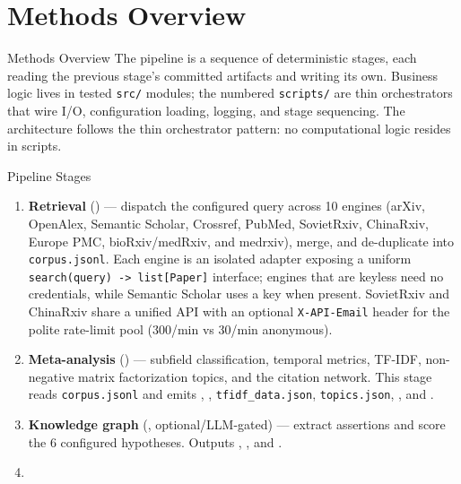 \documentclass[
  ignorenonframetext,
]{beamer}
\author{\texorpdfstring{}{}}
\date{}
\begin{document}
\section{Methods Overview}\label{methods-overview}

\begin{frame}{Methods Overview}
The pipeline is a sequence of deterministic stages, each reading the
previous stage's committed artifacts and writing its own. Business logic
lives in tested \texttt{src/} modules; the numbered \texttt{scripts/}
are thin orchestrators that wire I/O, configuration loading, logging,
and stage sequencing. The architecture follows the thin orchestrator
pattern: no computational logic resides in scripts.
\end{frame}

\begin{frame}{Pipeline Stages}
\protect{}\label{pipeline-stages}
\begin{enumerate}
\item
  \textbf{Retrieval} () --- dispatch
  the configured query across 10 engines (arXiv, OpenAlex, Semantic
  Scholar, Crossref, PubMed, SovietRxiv, ChinaRxiv, Europe PMC,
  bioRxiv/medRxiv, and medrxiv), merge, and de-duplicate into
  \texttt{corpus.jsonl}. Each engine is an isolated adapter exposing a
  uniform \texttt{search(query)\ -\textgreater{}\ list{[}Paper{]}}
  interface; engines that are keyless need no credentials, while
  Semantic Scholar uses a key when present. SovietRxiv and ChinaRxiv
  share a unified API with an optional \texttt{X-API-Email} header for
  the polite rate-limit pool (300/min vs 30/min anonymous).
\item
  \textbf{Meta-analysis} () ---
  subfield classification, temporal metrics, TF-IDF, non-negative matrix
  factorization topics, and the citation network. This stage reads
  \texttt{corpus.jsonl} and emits
  ,
  , \texttt{tfidf\_data.json},
  \texttt{topics.json}, , and
  .
\item
  \textbf{Knowledge graph} (,
  optional/LLM-gated) --- extract assertions and score the 6 configured
  hypotheses. Outputs ,
  , and
  .
\item

\end{enumerate}
\end{frame}
\end{document}

